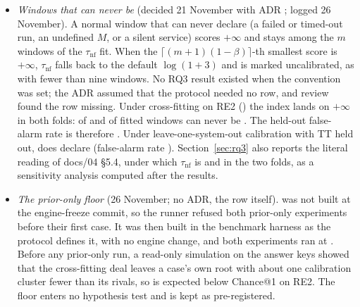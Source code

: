 \begin{itemize}
\item \emph{Windows that can never be \NOFAULT} (decided 21 November with ADR \allowbreak{}; logged 26 November). A normal window that \sys can never declare \NOFAULT (a failed or timed-out run, an undefined $M$, or a silent service) scores $+\infty$ and stays among the $m$ windows of the $\tau_\text{nf}$ fit. When the $\lceil (m+1)(1-\beta) \rceil$-th smallest score is $+\infty$, $\tau_\text{nf}$ falls back to the default $\log(1+3)$ and is marked uncalibrated, as with fewer than nine windows. No RQ3 result existed when the convention was set; the ADR assumed that the protocol needed no row, and review found the row missing. Under cross-fitting on RE2 (\allowbreak{}) the index lands on $+\infty$ in both folds:  of  and  of  fitted windows can never be \NOFAULT. The held-out false-alarm rate is therefore . Under leave-one-system-out calibration with TT held out, \sys does declare \NOFAULT (false-alarm rate ). Section~\ref{sec:rq3} also reports the literal reading of docs/04 §5.4, under which $\tau_\text{nf}$ is  and  in the two folds, as a sensitivity analysis computed after the results.
\item \emph{The prior-only floor} (26 November; no ADR, the row itself).  was not built at the engine-freeze commit, so the runner refused both prior-only experiments before their first case. It was then built in the benchmark harness as the protocol defines it, with no engine change, and both experiments ran at \allowbreak{}. Before any prior-only run, a read-only simulation on the answer keys showed that the cross-fitting deal leaves a case's own root with about one calibration cluster fewer than its rivals, so  is expected below Chance@1 on RE2. The floor enters no hypothesis test and is kept as pre-registered.

\end{itemize}
